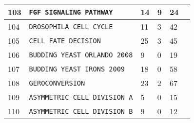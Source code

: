 \documentclass{article}
\begin{document}
\begin{center}
\begin{tabular}{ | C{16pt} | C{149pt} | C{25pt} | C{25pt} | C{25pt} | C{35pt} | }
		103 & \texttt{FGF SIGNALING PATHWAY} & 14 & 9 & 24 & \cite{bbm-098-099-100-101-102-103, ginsim} \\
		 & \texttt{DROSOPHILA CELL CYCLE} & 11 & 3 & 42 & \cite{bbm-104, ginsim} \\
		 & \texttt{CELL FATE DECISION} & 25 & 3 & 45 & \cite{bbm-105, ginsim} \\
		 & \texttt{BUDDING YEAST ORLANDO 2008} & 9 & 0 & 19 & \cite{bbm-106, ginsim} \\
		 & \texttt{BUDDING YEAST IRONS 2009} & 18 & 0 & 58 & \cite{bbm-107, ginsim} \\
		 & \texttt{GEROCONVERSION} & 23 & 2 & 67 & \cite{bbm-108, ginsim} \\
		 & \texttt{ASYMMETRIC CELL DIVISION A} & 5 & 0 & 15 & \cite{bbm-109-110, ginsim} \\
		 & \texttt{ASYMMETRIC CELL DIVISION B} & 9 & 0 & 12 & \cite{bbm-109-110, ginsim} \\
		\hline
	\end{tabular}	
\end{center}



\end{document}
